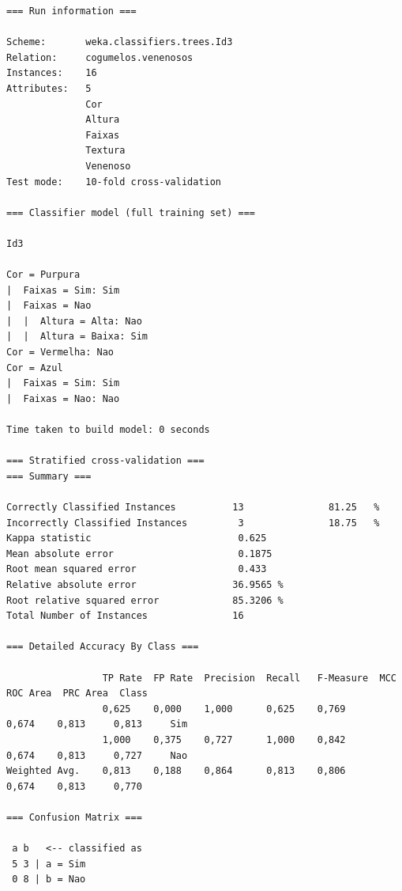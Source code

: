 \documentclass[
    article,            %
    11pt,               %
    oneside,            %
    a4paper,            %
    english,            %
    brazil,             %
    sumario=tradicional,
    ]{abntex2}
\begin{document}
\begin{Verbatim}[frame=single, fontsize=\tiny]
=== Run information ===

Scheme:       weka.classifiers.trees.Id3 
Relation:     cogumelos.venenosos
Instances:    16
Attributes:   5
              Cor
              Altura
              Faixas
              Textura
              Venenoso
Test mode:    10-fold cross-validation

=== Classifier model (full training set) ===

Id3

Cor = Purpura
|  Faixas = Sim: Sim
|  Faixas = Nao
|  |  Altura = Alta: Nao
|  |  Altura = Baixa: Sim
Cor = Vermelha: Nao
Cor = Azul
|  Faixas = Sim: Sim
|  Faixas = Nao: Nao

Time taken to build model: 0 seconds

=== Stratified cross-validation ===
=== Summary ===

Correctly Classified Instances          13               81.25   %
Incorrectly Classified Instances         3               18.75   %
Kappa statistic                          0.625 
Mean absolute error                      0.1875
Root mean squared error                  0.433 
Relative absolute error                 36.9565 %
Root relative squared error             85.3206 %
Total Number of Instances               16     

=== Detailed Accuracy By Class ===

                 TP Rate  FP Rate  Precision  Recall   F-Measure  MCC      ROC Area  PRC Area  Class
                 0,625    0,000    1,000      0,625    0,769      0,674    0,813     0,813     Sim
                 1,000    0,375    0,727      1,000    0,842      0,674    0,813     0,727     Nao
Weighted Avg.    0,813    0,188    0,864      0,813    0,806      0,674    0,813     0,770     

=== Confusion Matrix ===

 a b   <-- classified as
 5 3 | a = Sim
 0 8 | b = Nao
\end{Verbatim}
\end{document}
